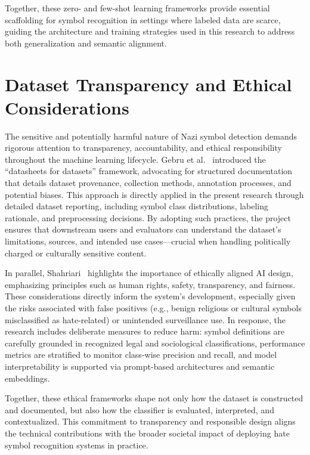 Together, these zero- and few-shot learning frameworks provide essential scaffolding for symbol recognition in
settings where labeled data are scarce, guiding the architecture and training strategies used in this research to
address both generalization and semantic alignment.

\section{Dataset Transparency and Ethical Considerations}

The sensitive and potentially harmful nature of Nazi symbol detection demands rigorous attention to transparency,
accountability, and ethical responsibility throughout the machine learning lifecycle. Gebru et al.~
\parencite{gebru2021datasheets} introduced the “datasheets for datasets” framework, advocating for structured
documentation that details dataset provenance, collection methods, annotation processes, and potential biases. This
approach is directly applied in the present research through detailed dataset reporting, including symbol class
distributions, labeling rationale, and preprocessing decisions. By adopting such practices, the project ensures that
downstream users and evaluators can understand the dataset’s limitations, sources, and intended use cases—crucial
when handling politically charged or culturally sensitive content.

In parallel, Shahriari~\parencite{ieee2021ethics} highlights the importance of ethically aligned AI design,
emphasizing principles such as human rights, safety, transparency, and fairness. These considerations directly
inform the system’s development, especially given the risks associated with false positives (e.g., benign religious
or cultural symbols misclassified as hate-related) or unintended surveillance use. In response, the research
includes deliberate measures to reduce harm: symbol definitions are carefully grounded in recognized legal and
sociological classifications, performance metrics are stratified to monitor class-wise precision and recall, and
model interpretability is supported via prompt-based architectures and semantic embeddings.

Together, these ethical frameworks shape not only how the dataset is constructed and documented, but also how the
classifier is evaluated, interpreted, and contextualized. This commitment to transparency and responsible design
aligns the technical contributions with the broader societal impact of deploying hate symbol recognition systems in
practice.
